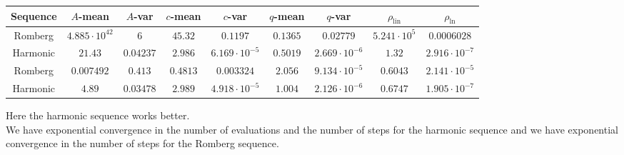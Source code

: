 \begin{table}[H]
    \centering
    \small
    \begin{tabular}{c||c|c|c|c|c|c|c|c}
Sequence & \(A\)-mean & \(A\)-var & \(c\)-mean & \(c\)-var & \(q\)-mean & \(q\)-var & \(\rho_{\operatorname{lin}}\) & \(\rho_{\ln}\)\\\hline
\rowcolor{red}
Romberg & \(4.885\cdot 10^{42}\) & \(6\) & \(45.32\) & \(0.1197\) & \(0.1365\) & \(0.02779\) & \(5.241\cdot 10^5\) & \(0.0006028\) \\
\rowcolor{green}
Harmonic & \(21.43\) & \(0.04237\) & \(2.986\) & \(6.169\cdot 10^{-5}\) & \(0.5019\) & \(2.669\cdot 10^{-6}\) & \(1.32\) & \(2.916\cdot 10^{-7}\) \\
\rowcolor{green}
Romberg & \(0.007492\) & \(0.413\) & \(0.4813\) & \(0.003324\) & \(2.056\) & \(9.134\cdot 10^{-5}\) & \(0.6043\) & \(2.141\cdot 10^{-5}\) \\
\rowcolor{green}
Harmonic & \(4.89\) & \(0.03478\) & \(2.989\) & \(4.918\cdot 10^{-5}\) & \(1.004\) & \(2.126\cdot 10^{-6}\) & \(0.6747\) & \(1.905\cdot 10^{-7}\) \\
    \end{tabular}
    \label{tab:my_label}
\end{table}

Here the harmonic sequence works better.\\

We have exponential convergence in the number of evaluations and the number of steps for the harmonic sequence and we have exponential convergence in the number of steps for the Romberg sequence.

